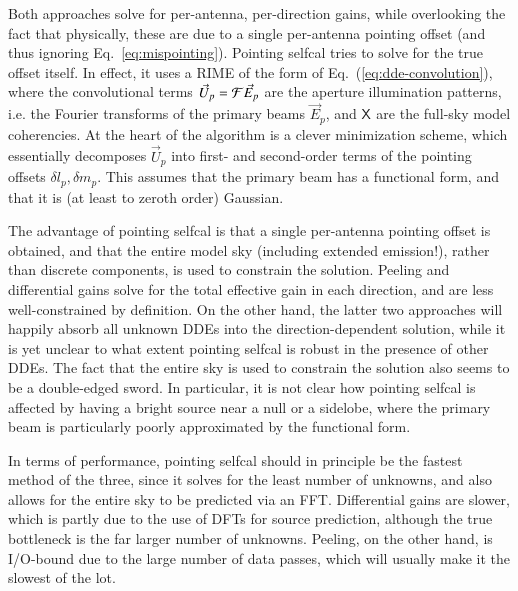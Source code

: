 \documentclass{aa}
\newcommand{\jones}[2]{\vec {#1}_{#2}}
\newcommand{\coh}[2]{\mathsf{{#1}}_{{#2}}}
\begin{document}
Both approaches solve for per-antenna, per-direction gains, while overlooking the fact that physically, these are due to a single per-antenna pointing offset (and thus ignoring Eq.~\ref{eq:mispointing}). Pointing selfcal tries to solve for the true offset itself. In effect, it uses a RIME of the form of Eq.~(\ref{eq:dde-convolution}), where the convolutional terms $\jones{U}{p}={\cal F}\jones{E}{p}$ are the aperture illumination patterns, i.e. the Fourier transforms of the primary beams $\jones{E}{p}$, and $\coh{X}{}$ are the full-sky model coherencies. At the heart of the algorithm is a clever minimization scheme, which essentially decomposes $\jones{U}{p}$ into first- and second-order terms of the pointing offsets $\delta l_p,\delta m_p$. This assumes that the primary beam has a functional form, and that it is (at least to zeroth order) Gaussian. 

The advantage of pointing selfcal is that a single per-antenna pointing offset is obtained, and that the entire model sky (including extended emission!), rather than discrete components, is used to constrain the solution. Peeling and differential gains solve for the total effective gain in each direction, and are less well-constrained by definition. On the other hand, the latter two approaches will happily absorb all unknown DDEs into the direction-dependent solution, while it is yet unclear to what extent pointing selfcal is robust in the presence of other DDEs. The fact that the entire sky is used to constrain the solution also seems to be a double-edged sword. In particular, it is not clear how pointing selfcal is affected by having a bright source near a null or a sidelobe, where the primary beam is particularly poorly approximated by the functional form. 

In terms of performance, pointing selfcal should in principle be the fastest method of the three, since it solves for the least number of unknowns, and also allows for the entire sky to be predicted via an FFT. Differential gains are slower, which is partly due to the use of DFTs for source prediction, although the true bottleneck is the far larger number of unknowns. Peeling, on the other hand, is I/O-bound due to the large number of data passes, which will usually make it the slowest of the lot. 
\end{document}
